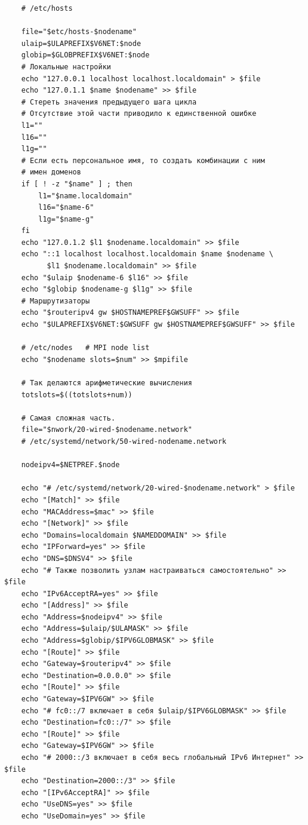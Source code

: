 \documentclass[12pt]{article}
\begin{document}
\begin{verbatim}
    # /etc/hosts

    file="$etc/hosts-$nodename"
    ulaip=$ULAPREFIX$V6NET:$node
    globip=$GLOBPREFIX$V6NET:$node
    # Локальные настройки
    echo "127.0.0.1 localhost localhost.localdomain" > $file
    echo "127.0.1.1 $name $nodename" >> $file
    # Стереть значения предыдущего шага цикла
    # Отсутствие этой части приводило к единственной ошибке
    l1=""
    l16=""
    l1g=""
    # Если есть персональное имя, то создать комбинации с ним
    # имен доменов
    if [ ! -z "$name" ] ; then
        l1="$name.localdomain"
        l16="$name-6"
        l1g="$name-g"
    fi
    echo "127.0.1.2 $l1 $nodename.localdomain" >> $file
    echo "::1 localhost localhost.localdomain $name $nodename \
          $l1 $nodename.localdomain" >> $file
    echo "$ulaip $nodename-6 $l16" >> $file
    echo "$globip $nodename-g $l1g" >> $file
    # Маршрутизаторы
    echo "$routeripv4 gw $HOSTNAMEPREF$GWSUFF" >> $file
    echo "$ULAPREFIX$V6NET:$GWSUFF gw $HOSTNAMEPREF$GWSUFF" >> $file

    # /etc/nodes   # MPI node list
    echo "$nodename slots=$num" >> $mpifile

    # Так делаются арифметические вычисления
    totslots=$((totslots+num))

    # Самая сложная часть.
    file="$nwork/20-wired-$nodename.network"
    # /etc/systemd/network/50-wired-nodename.network

    nodeipv4=$NETPREF.$node

    echo "# /etc/systemd/network/20-wired-$nodename.network" > $file
    echo "[Match]" >> $file
    echo "MACAddress=$mac" >> $file
    echo "[Network]" >> $file
    echo "Domains=localdomain $NAMEDDOMAIN" >> $file
    echo "IPForward=yes" >> $file
    echo "DNS=$DNSV4" >> $file
    echo "# Также позволить узлам настраиваться самостоятельно" >> $file
    echo "IPv6AcceptRA=yes" >> $file
    echo "[Address]" >> $file
    echo "Address=$nodeipv4" >> $file
    echo "Address=$ulaip/$ULAMASK" >> $file
    echo "Address=$globip/$IPV6GLOBMASK" >> $file
    echo "[Route]" >> $file
    echo "Gateway=$routeripv4" >> $file
    echo "Destination=0.0.0.0" >> $file
    echo "[Route]" >> $file
    echo "Gateway=$IPV6GW" >> $file
    echo "# fc0::/7 включает в себя $ulaip/$IPV6GLOBMASK" >> $file
    echo "Destination=fc0::/7" >> $file
    echo "[Route]" >> $file
    echo "Gateway=$IPV6GW" >> $file
    echo "# 2000::/3 включает в себя весь глобальный IPv6 Интернет" >> $file
    echo "Destination=2000::/3" >> $file
    echo "[IPv6AcceptRA]" >> $file
    echo "UseDNS=yes" >> $file
    echo "UseDomain=yes" >> $file


\end{verbatim}
\end{document}
